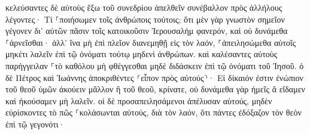 \documentclass{openreader}
\begin{document}
κελεύσαντες δὲ αὐτοὺς ἔξω τοῦ συνεδρίου ἀπελθεῖν συνέβαλλον πρὸς ἀλλήλους 
λέγοντες· Τί ⸀ποιήσωμεν τοῖς ἀνθρώποις τούτοις; ὅτι μὲν γὰρ γνωστὸν σημεῖον γέγονεν δι’ αὐτῶν πᾶσιν τοῖς κατοικοῦσιν Ἰερουσαλὴμ φανερόν, καὶ οὐ δυνάμεθα ⸀ἀρνεῖσθαι· 
ἀλλ’ ἵνα μὴ ἐπὶ πλεῖον διανεμηθῇ εἰς τὸν λαόν, ⸀ἀπειλησώμεθα αὐτοῖς μηκέτι λαλεῖν ἐπὶ τῷ ὀνόματι τούτῳ μηδενὶ ἀνθρώπων. 
καὶ καλέσαντες αὐτοὺς παρήγγειλαν ⸀τὸ καθόλου μὴ φθέγγεσθαι μηδὲ διδάσκειν ἐπὶ τῷ ὀνόματι τοῦ Ἰησοῦ. 
ὁ δὲ Πέτρος καὶ Ἰωάννης ἀποκριθέντες ⸂εἶπον πρὸς αὐτούς⸃· Εἰ δίκαιόν ἐστιν ἐνώπιον τοῦ θεοῦ ὑμῶν ἀκούειν μᾶλλον ἢ τοῦ θεοῦ, κρίνατε, 
οὐ δυνάμεθα γὰρ ἡμεῖς ἃ εἴδαμεν καὶ ἠκούσαμεν μὴ λαλεῖν. 
οἱ δὲ προσαπειλησάμενοι ἀπέλυσαν αὐτούς, μηδὲν εὑρίσκοντες τὸ πῶς ⸀κολάσωνται αὐτούς, διὰ τὸν λαόν, ὅτι πάντες ἐδόξαζον τὸν θεὸν ἐπὶ τῷ γεγονότι· 
\end{document}
